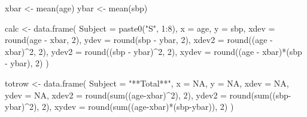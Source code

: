 \documentclass[
  12pt,
  letterpaper,
]{book}
\newenvironment{Shaded}{\begin{snugshade}}{\end{snugshade}}
\newcommand{\AttributeTok}[1]{\textcolor[rgb]{0.40,0.45,0.13}{#1}}
\newcommand{\ConstantTok}[1]{\textcolor[rgb]{0.56,0.35,0.01}{#1}}
\newcommand{\DecValTok}[1]{\textcolor[rgb]{0.68,0.00,0.00}{#1}}
\newcommand{\FunctionTok}[1]{\textcolor[rgb]{0.28,0.35,0.67}{#1}}
\newcommand{\NormalTok}[1]{\textcolor[rgb]{0.00,0.23,0.31}{#1}}
\newcommand{\OtherTok}[1]{\textcolor[rgb]{0.00,0.23,0.31}{#1}}
\newcommand{\SpecialCharTok}[1]{\textcolor[rgb]{0.37,0.37,0.37}{#1}}
\newcommand{\StringTok}[1]{\textcolor[rgb]{0.13,0.47,0.30}{#1}}
\begin{document}
\begin{tcolorbox}[enhanced jigsaw, arc=.35mm, bottomrule=.15mm, bottomtitle=1mm, breakable, colback=white, colbacktitle=quarto-callout-tip-color!10!white, colframe=quarto-callout-tip-color-frame, coltitle=black, left=2mm, leftrule=.75mm, opacityback=0, opacitybacktitle=0.6, rightrule=.15mm, title={✅ Solution}, titlerule=0mm, toprule=.15mm, toptitle=1mm]

\begin{Shaded}
\begin{Highlighting}[]
\NormalTok{xbar }\OtherTok{\textless{}{-}} \FunctionTok{mean}\NormalTok{(age)}
\NormalTok{ybar }\OtherTok{\textless{}{-}} \FunctionTok{mean}\NormalTok{(sbp)}

\NormalTok{calc }\OtherTok{\textless{}{-}} \FunctionTok{data.frame}\NormalTok{(}
  \AttributeTok{Subject =} \FunctionTok{paste0}\NormalTok{(}\StringTok{"S"}\NormalTok{, }\DecValTok{1}\SpecialCharTok{:}\DecValTok{8}\NormalTok{),}
  \AttributeTok{x =}\NormalTok{ age,}
  \AttributeTok{y =}\NormalTok{ sbp,}
  \AttributeTok{xdev =} \FunctionTok{round}\NormalTok{(age }\SpecialCharTok{{-}}\NormalTok{ xbar, }\DecValTok{2}\NormalTok{),}
  \AttributeTok{ydev =} \FunctionTok{round}\NormalTok{(sbp }\SpecialCharTok{{-}}\NormalTok{ ybar, }\DecValTok{2}\NormalTok{),}
  \AttributeTok{xdev2 =} \FunctionTok{round}\NormalTok{((age }\SpecialCharTok{{-}}\NormalTok{ xbar)}\SpecialCharTok{\^{}}\DecValTok{2}\NormalTok{, }\DecValTok{2}\NormalTok{),}
  \AttributeTok{ydev2 =} \FunctionTok{round}\NormalTok{((sbp }\SpecialCharTok{{-}}\NormalTok{ ybar)}\SpecialCharTok{\^{}}\DecValTok{2}\NormalTok{, }\DecValTok{2}\NormalTok{),}
  \AttributeTok{xydev =} \FunctionTok{round}\NormalTok{((age }\SpecialCharTok{{-}}\NormalTok{ xbar)}\SpecialCharTok{*}\NormalTok{(sbp }\SpecialCharTok{{-}}\NormalTok{ ybar), }\DecValTok{2}\NormalTok{)}
\NormalTok{)}

\NormalTok{totrow }\OtherTok{\textless{}{-}} \FunctionTok{data.frame}\NormalTok{(}
  \AttributeTok{Subject =} \StringTok{"**Total**"}\NormalTok{,}
  \AttributeTok{x =} \ConstantTok{NA}\NormalTok{, }\AttributeTok{y =} \ConstantTok{NA}\NormalTok{,}
  \AttributeTok{xdev =} \ConstantTok{NA}\NormalTok{, }\AttributeTok{ydev =} \ConstantTok{NA}\NormalTok{,}
  \AttributeTok{xdev2 =} \FunctionTok{round}\NormalTok{(}\FunctionTok{sum}\NormalTok{((age}\SpecialCharTok{{-}}\NormalTok{xbar)}\SpecialCharTok{\^{}}\DecValTok{2}\NormalTok{), }\DecValTok{2}\NormalTok{),}
  \AttributeTok{ydev2 =} \FunctionTok{round}\NormalTok{(}\FunctionTok{sum}\NormalTok{((sbp}\SpecialCharTok{{-}}\NormalTok{ybar)}\SpecialCharTok{\^{}}\DecValTok{2}\NormalTok{), }\DecValTok{2}\NormalTok{),}
  \AttributeTok{xydev =} \FunctionTok{round}\NormalTok{(}\FunctionTok{sum}\NormalTok{((age}\SpecialCharTok{{-}}\NormalTok{xbar)}\SpecialCharTok{*}\NormalTok{(sbp}\SpecialCharTok{{-}}\NormalTok{ybar)), }\DecValTok{2}\NormalTok{)}
\NormalTok{)}


\end{Highlighting}
\end{Shaded}
\end{tcolorbox}
\end{document}
